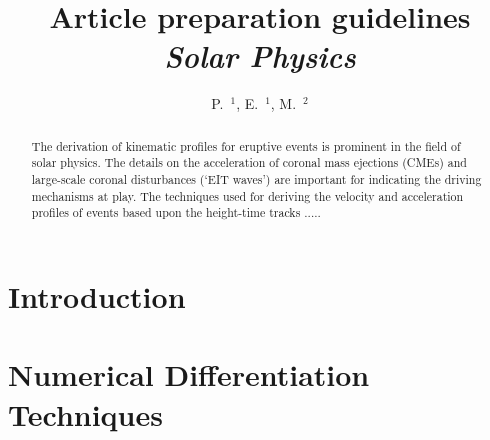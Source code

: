 \documentclass[namedreferences]{SolarPhysics}
\begin{document}
\begin{article}

\begin{opening}

\title{Article preparation guidelines\\ {\it Solar Physics}}

\author{P.~$^{1}$\sep
        E.~$^{1}$\sep
        M.~$^{2}$      
       }


\begin{abstract}
The derivation of kinematic profiles for eruptive events is prominent in the field of solar physics. The details on the acceleration of coronal mass ejections (CMEs) and large-scale coronal disturbances (`EIT waves') are important for indicating the driving mechanisms at play. The techniques used for deriving the velocity and acceleration profiles of events based upon the height-time tracks .....


\end{abstract}
\end{opening}

\section{Introduction}
     \label{S-Introduction} 



 

\section{Numerical Differentiation Techniques} %
 

\end{article}
\end{document}
